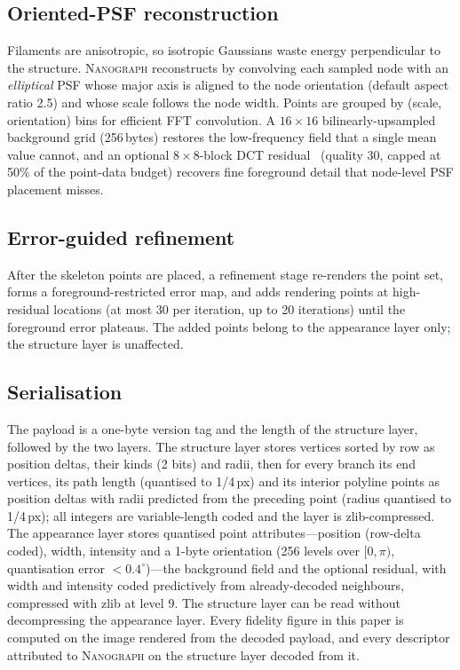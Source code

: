\documentclass[10pt,a4paper]{article}
\newcommand{\method}{\textnormal{\textsc{Nanograph}}\xspace}
\begin{document}
\subsection{Oriented-PSF reconstruction}
Filaments are anisotropic, so isotropic Gaussians waste energy perpendicular
to the structure. \method reconstructs by convolving each sampled node with an
\emph{elliptical} PSF whose major axis is aligned to the node orientation
(default aspect ratio 2.5) and whose scale follows the node width. Points are
grouped by (scale, orientation) bins for efficient FFT convolution. A
$16\times16$ bilinearly-upsampled background grid (256\,bytes) restores the
low-frequency field that a single mean value cannot, and an optional
$8\times8$-block DCT residual~\cite{ahmed1974dct} (quality 30, capped at 50\%
of the point-data budget) recovers fine foreground detail that node-level PSF
placement misses.

\subsection{Error-guided refinement}
\label{sec:optimizer}
After the skeleton points are placed, a refinement stage re-renders the
point set, forms a foreground-restricted error map, and adds rendering
points at high-residual locations (at most 30 per iteration, up to 20
iterations) until the foreground error plateaus. The added points belong to
the appearance layer only; the structure layer is unaffected.

\subsection{Serialisation}\label{sec:compression}
The payload is a one-byte version tag and the length of the structure layer,
followed by the two layers. The structure layer stores vertices sorted by
row as position deltas, their kinds (2 bits) and radii, then for every
branch its end vertices, its path length (quantised to 1/4\,px) and its
interior polyline points as position deltas with radii predicted from the
preceding point (radius quantised to 1/4\,px); all integers are variable-length
coded and the layer is zlib-compressed. The appearance layer stores quantised
point attributes---position (row-delta coded), width, intensity and a 1-byte
orientation (256 levels over $[0,\pi)$, quantisation error $<0.4^\circ$)---the
background field and the optional residual, with width and intensity coded
predictively from already-decoded neighbours, compressed with zlib at level
9. The structure layer can be read without decompressing the appearance
layer. Every fidelity figure in this paper is computed on the image
rendered from the decoded payload, and every descriptor attributed to
\method on the structure layer decoded from it.
\end{document}
